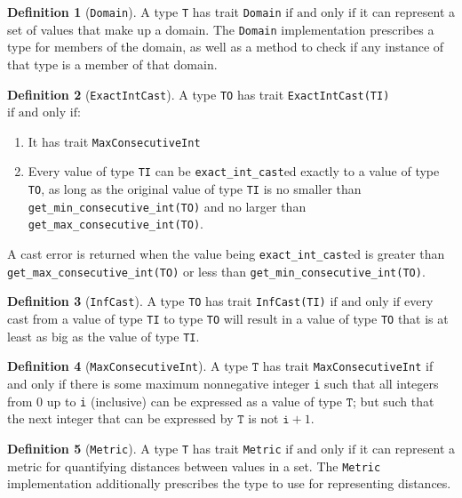 \documentclass[11pt,a4paper]{article}
\theoremstyle{definition}
\newtheorem{definition}{Definition}[section]
\newcommand{\T}{\texttt{T}}
\newcommand{\iffText}{\text{if and only if}}
\begin{document}
\begin{definition}[\texttt{Domain}]
A type \texttt{T} has trait \texttt{Domain} $\iffText$ it can represent a set of values that make up a domain. The \texttt{Domain} implementation prescribes a type for members of the domain, as well as a method to check if any instance of that type is a member of that domain.
\end{definition}

\begin{definition}[\texttt{ExactIntCast}]
    A type \texttt{TO} has trait \texttt{ExactIntCast(TI)} $\iffText$:
    \begin{enumerate}
    \item It has trait \texttt{MaxConsecutiveInt}
    \item Every value of type \texttt{TI} can be \texttt{exact\_int\_cast}ed exactly to a value of type \texttt{TO}, as long as the original value of type \texttt{TI} is no smaller than \texttt{get\_min\_consecutive\_int(TO)} and no larger than \texttt{get\_max\_consecutive\_int(TO)}.
    \end{enumerate}
    
    A cast error is returned when the value being \texttt{exact\_int\_cast}ed is greater than \texttt{get\_max\_consecutive\_int(TO)} or less than \texttt{get\_min\_consecutive\_int(TO)}.
\end{definition}

\begin{definition}[\texttt{InfCast}]
A type \texttt{TO} has trait \texttt{InfCast(TI)} $\iffText$ every cast from a value of type \texttt{TI} to type \texttt{TO} will result in a value of type \texttt{TO} that is at least as big as the value of type \texttt{TI}.
\end{definition}

\begin{definition}[\texttt{MaxConsecutiveInt}]
A type $\T$ has trait \texttt{MaxConsecutiveInt} if and only if there is some maximum nonnegative integer \texttt{i} such that all integers from 0 up to \texttt{i} (inclusive) can be expressed as a value of type $\T$; but such that the next integer that can be expressed by $\T$ is not $\texttt{i}+1$.
\end{definition}

\begin{definition}[\texttt{Metric}]
A type \texttt{T} has trait \texttt{Metric} $\iffText$ it can represent a metric for quantifying distances between values in a set. The \texttt{Metric} implementation additionally prescribes the type to use for representing distances.
\end{definition}
\end{document}
